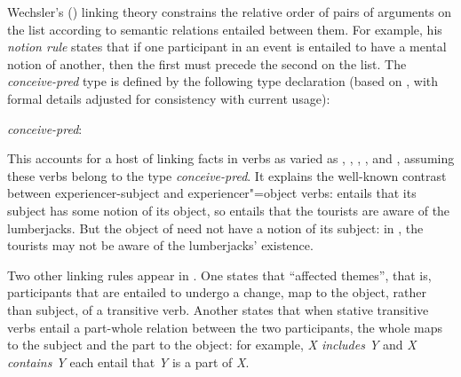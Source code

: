 \documentclass[output=paper,biblatex,babelshorthands,newtxmath,draftmode,colorlinks, citecolor=brown]{langscibook}
\begin{document}
Wechsler's (\citeyear{Wechsler1995b}) linking theory constrains the
relative order of pairs of arguments on the \argst list according to semantic relations entailed
between them.  For example, his \emph{notion rule} states
that if one participant in an event is entailed to have a mental notion of another, then the first
must precede the second on the \argst list.  The \textit{conceive-pred} type is defined by the
following type declaration (based on \citealt[127]{Wechsler1995b}, with formal details adjusted for
consistency with current usage):

\begin{exe}
\ex\label{conceive}
\textit{conceive-pred}:\\  
\end{exe}

This accounts for a host of linking facts in verbs as varied as , ,
, , and , assuming these verbs belong to the type
\textit{conceive-pred}.  It explains the well-known contrast between experiencer-subject 
and experiencer"=object  verbs:  entails that its subject has some notion
of its object, so  entails that the tourists are aware of
the lumberjacks.  But the object of  need not have a notion of its subject: in
, the tourists may not be aware of the lumberjacks' existence.

Two other linking rules appear in \citet{Wechsler1995b}.  One states that ``affected themes'', that
is, participants that are entailed to undergo a change, map to the object, rather than subject, of a
transitive verb.  Another states that when stative transitive verbs entail a part-whole relation
between the two participants, the whole maps to the subject and the part to the object: for example,
\textit{X includes Y} and \textit{X contains Y} each entail that \textit{Y} is a part of \textit{X}.
\end{document}
